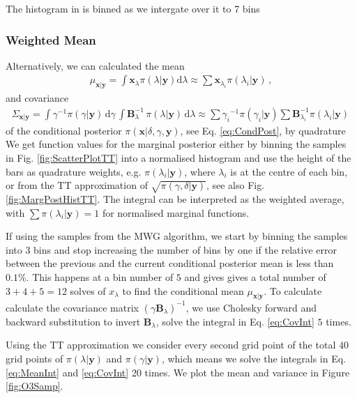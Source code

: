 The histogram in is binned as we intergate over it to 7 bins

\subsubsection{Weighted Mean}
Alternatively, we can calculated the mean
\begin{align}
	\mu_{\bm{x}|\bm{y}} = \int \bm{x}_{\lambda} \pi(\lambda| \bm{y}) \text{d}\lambda \approx \sum \bm{x}_{\lambda_i} \pi(\lambda_i| \bm{y}) \, , \label{eq:MeanInt}
\end{align} and covariance
 \begin{align}
 	\Sigma_{\bm{x}|\bm{y}} = \int \gamma^{-1}  \pi(\gamma | \bm{y} ) \, \text{d} \gamma \, \int  \bm{B}_{\lambda}^{-1} \, \pi(\lambda | \bm{y} )  \, \text{d} \lambda  \approx \sum {\gamma_i}^{-1}\pi(\gamma_i| \bm{y}) \sum \bm{B}_{\lambda_i}^{-1}\pi(\lambda_i| \bm{y})\, \label{eq:CovInt}
 \end{align}
of the conditional posterior $\pi(\bm{x}| \delta, \gamma, \bm{y})$, see Eq. \ref{eq:CondPost}, by quadrature \cite[Sec. 2.1]{Dick_Kuo_Sloan_2013}
We get function values for the marginal posterior either by binning the samples in Fig. \ref{fig:ScatterPlotTT} into a normalised histogram and use the height of the bars as quadrature weights, e.g. $\pi(\lambda_i| \bm{y})$, where $\lambda_i$ is at the centre of each bin, or from the TT approximation of $\sqrt{ \pi(\gamma, \delta | \bm{y}) }$, see also Fig. \ref{fig:MargPostHistTT}.
The integral can be interpreted as the weighted average, with $\sum \pi(\lambda_i| \bm{y}) = 1$ for normalised marginal functions.

If using the samples from the MWG algorithm, we start by binning the samples into $3$ bins and stop increasing the number of bins by one if the relative error between the previous and the current conditional posterior mean is less than $0.1\%$.
This happens at a bin number of $5$ and gives gives a total number of $3+4+5 = 12$ solves of $x_{\lambda}$ to find the conditional mean $	\mu_{\bm{x}|\bm{y}}$.
To calculate calculate the covariance matrix $(\gamma \bm{B}_{\lambda})^{-1} $, we use Cholesky forward and backward substitution to invert $\bm{B}_{\lambda}$, solve the integral in Eq. \ref{eq:CovInt} $5$ times.

Using the TT approximation we consider every second grid point of the total $40$ grid points of $\pi(\lambda| \bm{y})$ and $\pi(\gamma| \bm{y})$, which means we solve the integrals in Eq. \ref{eq:MeanInt} and \ref{eq:CovInt} 20 times.
We plot the mean and variance in Figure \ref{fig:O3Samp}.


